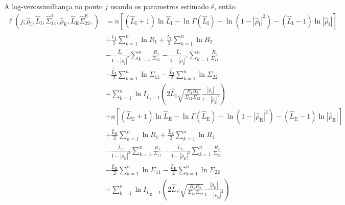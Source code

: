 A log-verossimilhança no ponto $j$ usando os parametros estimado é, então
\begin{equation}\label{eq:TotalLogLikelihood_biv_prod}
\begin{split}
\ell(j;\widehat{\rho}_\text{I}, \widehat{L}_\text{I}, \widehat{\Sigma}_{11}^\text{I}, \widehat{\rho}_\text{E}, \widehat{L}_\text{E}\widehat{\Sigma}_{22}^\text{E},)&=n\left[(\widehat{L}_\text{I}+1)\ln \widehat{L}_\text{I} - \ln\Gamma(\widehat{L}_\text{I})- \ln(1-|\widehat{\rho}_\text{I}|^2)-(\widehat{L}_\text{I}-1)\ln|\widehat{\rho}_\text{I}|\right] \\
                        &+\frac{\widehat{L}_\text{I}}{2}\sum_{k=1}^{n} \ln R_1 +\frac{\widehat{L}_\text{I}}{2} \sum_{k=1}^{n}\ln R_2\\
                        &-\frac{\widehat{L}_\text{I}}{1-|\widehat{\rho}_\text{I}|^2}\sum_{k=1}^{n}\frac{R_1}{\Sigma_{11}}-\frac{\widehat{L}_\text{I}}{1-|\widehat{\rho}_\text{I}|^2}\sum_{k=1}^{n}\frac{R_2}{\Sigma_{22}}\\
	&-\frac{\widehat{L}_\text{I}}{2}\sum_{k=1}^{n}\ln\Sigma_{11}-\frac{\widehat{L}_\text{I}}{2}\sum_{k=1}^{n}\ln\Sigma_{22} \\
	&+\sum_{k=1}^{n}\ln I_{\widehat{L}_\text{I}-1}\left(2\widehat{L}_\text{I}\sqrt{\frac{R_1R_2}{\Sigma_{11}\Sigma_{22}}}\frac{|\widehat{\rho}_\text{I}|}{1-|\widehat{\rho}_\text{I}|^2}\right)\\
	&+n\left[(\widehat{L}_\text{E}+1)\ln \widehat{L}_\text{E} - \ln\Gamma(\widehat{L}_\text{E})- \ln(1-|\widehat{\rho}_\text{E}|^2)-(\widehat{L}_\text{E}-1)\ln|\widehat{\rho}_\text{E}|\right] \\
                        &+\frac{\widehat{L}_\text{E}}{2}\sum_{k=1}^{n} \ln R_1 +\frac{\widehat{L}_\text{E}}{2} \sum_{k=1}^{n}\ln R_2\\
                        &-\frac{\widehat{L}_\text{E}}{1-|\widehat{\rho}_\text{E}|^2}\sum_{k=1}^{n}\frac{R_1}{\Sigma_{11}}-\frac{\widehat{L}_\text{E}}{1-|\widehat{\rho}_\text{E}|^2}\sum_{k=1}^{n}\frac{R_2}{\Sigma_{22}}\\
	&-\frac{\widehat{L}_\text{E}}{2}\sum_{k=1}^{n}\ln\Sigma_{11}-\frac{\widehat{L}_\text{E}}{2}\sum_{k=1}^{n}\ln\Sigma_{22} \\
	&+\sum_{k=1}^{n}\ln I_{\widehat{L}_\text{E}-1}\left(2\widehat{L}_\text{E}\sqrt{\frac{R_1R_2}{\Sigma_{11}\Sigma_{22}}}\frac{|\widehat{\rho}_\text{E}|}{1-|\widehat{\rho}_\text{E}|^2}\right)
\end{split}
\end{equation}


